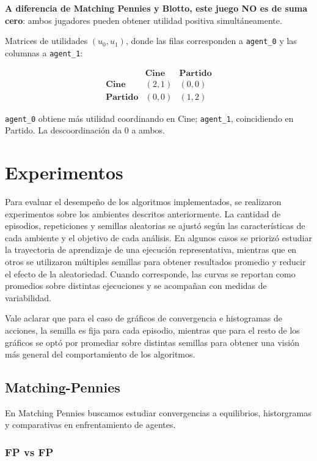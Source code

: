 \documentclass[letterpaper,12pt]{article} %
\begin{document}
\textbf{A diferencia de Matching Pennies y Blotto, este juego NO es de suma cero}: ambos jugadores pueden obtener utilidad positiva simultáneamente.

Matrices de utilidades $(u_0, u_1)$, donde las filas corresponden a \texttt{agent\_0} y las columnas a \texttt{agent\_1}:

\[
\begin{array}{c|cc}
 & \textbf{Cine} & \textbf{Partido} \\
\hline
\textbf{Cine} & (2,1) & (0,0) \\
\textbf{Partido} & (0,0) & (1,2)
\end{array}
\]

\texttt{agent\_0} obtiene más utilidad coordinando en Cine; \texttt{agent\_1}, coincidiendo en Partido. La descoordinación da $0$ a ambos.

\clearpage
\section{Experimentos}


Para evaluar el desempeño de los algoritmos implementados, se realizaron experimentos sobre los ambientes descritos anteriormente. La cantidad de episodios, repeticiones y semillas aleatorias se ajustó según las características de cada ambiente y el objetivo de cada análisis. En algunos casos se priorizó estudiar la trayectoria de aprendizaje de una ejecución representativa, mientras que en otros se utilizaron múltiples semillas para obtener resultados promedio y reducir el efecto de la aleatoriedad. Cuando corresponde, las curvas se reportan como promedios sobre distintas ejecuciones y se acompañan con medidas de variabilidad.

Vale aclarar que para el caso de gráficos de convergencia e histogramas de acciones, la semilla es fija para cada episodio, mientras que para el resto de los gráficos se optó por promediar sobre distintas semillas para obtener una visión más general del comportamiento de los algoritmos.

\subsection{Matching-Pennies}

En Matching Pennies buscamos estudiar convergencias a equilibrios, historgramas y comparativas en enfrentamiento de agentes.


\subsubsection*{FP vs FP}
\end{document}
